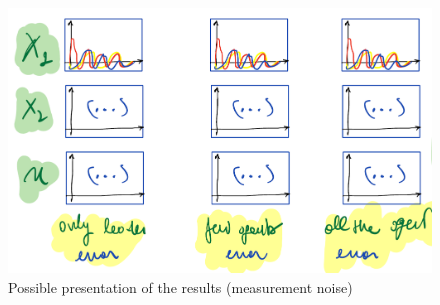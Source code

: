 \documentclass[a4paper,11pt]{article}
\begin{document}
    \begin{figure}[h]
        \centering
        \includegraphics[scale=0.4]{img/figNoise.png}
        \caption{Possible presentation of the results (measurement noise)}
    \end{figure}
\end{document}

